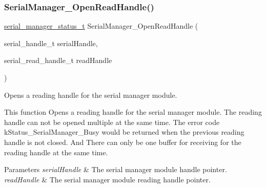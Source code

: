\subsubsection{\texorpdfstring{SerialManager\_OpenReadHandle()}{SerialManager\_OpenReadHandle()}}
{\footnotesize\ttfamily \mbox{\hyperlink{group__serialmanager_gac1d9f848c57ca245ad9da8d049369da9}{serial\+\_\+manager\+\_\+status\+\_\+t}} Serial\+Manager\+\_\+\+Open\+Read\+Handle (\begin{DoxyParamCaption}\item[{serial\+\_\+handle\+\_\+t}]{serial\+Handle,  }\item[{serial\+\_\+read\+\_\+handle\+\_\+t}]{read\+Handle }\end{DoxyParamCaption})}



Opens a reading handle for the serial manager module. 

This function Opens a reading handle for the serial manager module. The reading handle can not be opened multiple at the same time. The error code k\+Status\+\_\+\+Serial\+Manager\+\_\+\+Busy would be returned when the previous reading handle is not closed. And There can only be one buffer for receiving for the reading handle at the same time.


\begin{DoxyParams}{Parameters}
{\em serial\+Handle} & The serial manager module handle pointer. \\
\hline
{\em read\+Handle} & The serial manager module reading handle pointer. \\
\hline
\end{DoxyParams}

